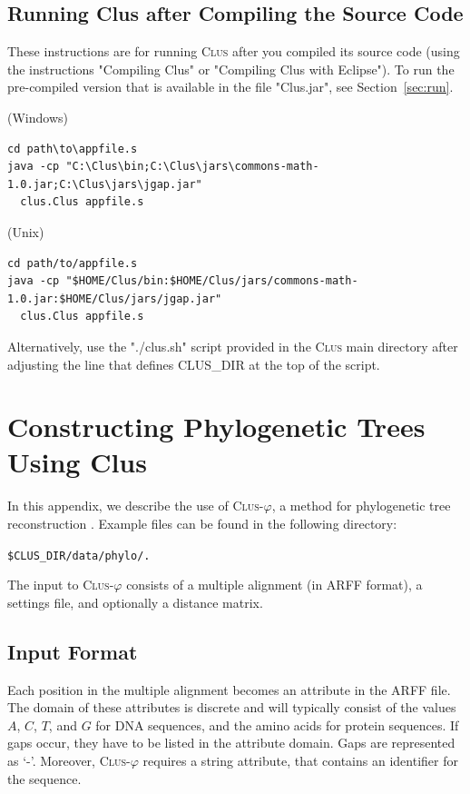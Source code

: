 \documentclass[a4paper]{report}
\newcommand{\clus}{\textsc{Clus}}
\newcommand{\clusphy}{\textsc{Clus}-$\varphi$}
\begin{document}
\section{Running Clus after Compiling the Source Code}

These instructions are for running \clus{} after you compiled its source code (using the instructions "Compiling Clus" or "Compiling Clus with Eclipse"). To run the pre-compiled version that is available in the file "Clus.jar", see Section~\ref{sec:run}.

(Windows)
\begin{small}
\begin{verbatim}
cd path\to\appfile.s
java -cp "C:\Clus\bin;C:\Clus\jars\commons-math-1.0.jar;C:\Clus\jars\jgap.jar" 
  clus.Clus appfile.s
\end{verbatim}
\end{small}

(Unix)

\begin{small}
\begin{verbatim}
cd path/to/appfile.s
java -cp "$HOME/Clus/bin:$HOME/Clus/jars/commons-math-1.0.jar:$HOME/Clus/jars/jgap.jar" 
  clus.Clus appfile.s
\end{verbatim}
\end{small}

Alternatively, use the "./clus.sh" script provided in the \clus{} main directory after adjusting the line that defines CLUS\_DIR at the top of the script.

\appendix
\chapter{Constructing Phylogenetic Trees Using Clus}

In this appendix, we describe the use of \clusphy{}, a method for phylogenetic tree reconstruction \cite{Vens10:proc}.
Example files can be found in the following directory:  
\begin{flushleft}
\verb^$CLUS_DIR/data/phylo/.^
\end{flushleft}

The input to \clusphy{} consists of a multiple alignment (in ARFF format), a settings file, and optionally a distance matrix.

\section{Input Format}
Each position in the multiple alignment becomes an attribute in the ARFF file. The domain of these attributes is discrete and will typically consist of the values $A$, $C$, $T$, and $G$ for DNA sequences, and the amino acids for protein sequences. If gaps occur, they have to be listed in the attribute domain. Gaps are represented as `-'.
Moreover, \clusphy{} requires a string attribute, that contains an identifier for the sequence.
\end{document}
